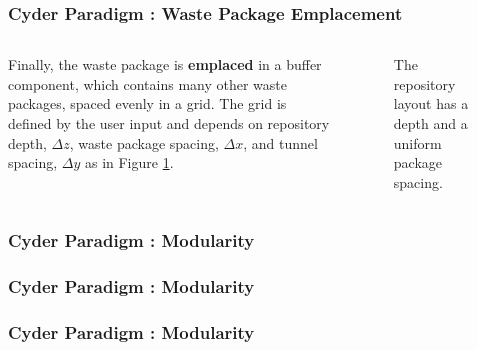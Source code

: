 \begin{frame}[ctb!]
  \frametitle{Cyder Paradigm : Waste Package Emplacement}
\footnotesize{
  \begin{columns}[c]
Finally, the waste package is \textbf{emplaced} in a buffer component, which 
contains many other waste packages, spaced evenly in a grid. The grid is 
defined by the user input and depends on repository depth, $\Delta z$, waste 
package spacing, $\Delta x$, and tunnel spacing, $\Delta y$ as in Figure 
\ref{fig:repo_layout}.

\begin{figure}[htbp!]
\begin{center}
\def\svgwidth{.5\textwidth}

\end{center}
\caption{The repository layout has a depth and a uniform package spacing.}
\label{fig:repo_layout}
\end{figure}
\end{columns}
  }
\end{frame}


\begin{frame}[ctb!]
  \frametitle{Cyder Paradigm : Modularity }
\begin{figure}[htbp!]
\begin{center}
\def\svgwidth{.6\textwidth}

\end{center}
\label{fig:modularity_layout}
\end{figure}
\end{frame}


\begin{frame}[ctb!]
  \frametitle{Cyder Paradigm : Modularity }
\begin{figure}[htbp!]
\begin{center}
\def\svgwidth{.6\textwidth}

\end{center}
\label{fig:modularity_circle}
\end{figure}
\end{frame}


\begin{frame}[ctb!]
  \frametitle{Cyder Paradigm : Modularity }
\begin{figure}[htbp!]
\begin{center}
\def\svgwidth{.6\textwidth}

\end{center}
\label{fig:modularity_colors}
\end{figure}
\end{frame}

